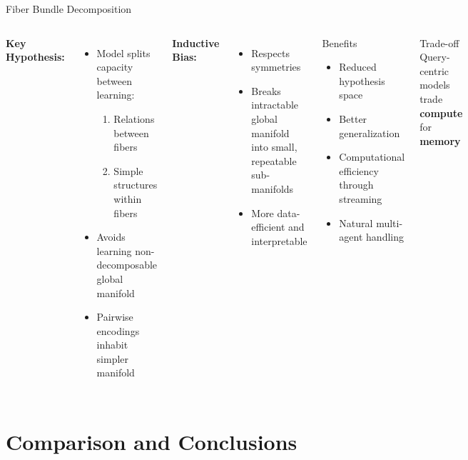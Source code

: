 \documentclass[10pt,aspectratio=169]{beamer}
\begin{document}
\begin{frame}{Fiber Bundle Decomposition}
\begin{columns}[T]
\textbf{Key Hypothesis:}
\begin{itemize}
    \item Model splits capacity between learning:
    \begin{enumerate}
        \item Relations between fibers
        \item Simple structures within fibers
    \end{enumerate}
    \item Avoids learning non-decomposable global manifold
    \item Pairwise encodings inhabit simpler manifold
\end{itemize}

\textbf{Inductive Bias:}
\begin{itemize}
    \item Respects symmetries
    \item Breaks intractable global manifold into small, repeatable sub-manifolds
    \item More data-efficient and interpretable
\end{itemize}

\begin{block}{Benefits}
\begin{itemize}
    \item Reduced hypothesis space
    \item Better generalization
    \item Computational efficiency through streaming
    \item Natural multi-agent handling
\end{itemize}
\end{block}

\begin{alertblock}{Trade-off}
Query-centric models trade \textbf{compute} for \textbf{memory}
\end{alertblock}
\end{columns}
\end{frame}

\section{Comparison and Conclusions}
\end{document}
